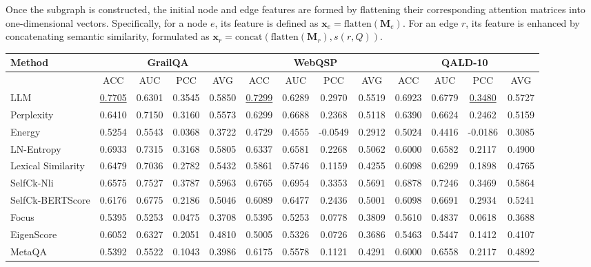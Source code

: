 \documentclass[11pt]{article}
\begin{document}
Once the subgraph is constructed, the initial node and edge features are formed by flattening their corresponding attention matrices into one-dimensional vectors. Specifically, for a node $e$, its feature is defined as \(\mathbf{x}_e = \text{flatten}(\mathbf{M}_e)\). For an edge $r$, its feature is enhanced by concatenating semantic similarity, formulated as \(\mathbf{x}_r = \text{concat}( \text{flatten}(\mathbf{M}_r), s(r, Q))\).

\begin{table}[t]
\centering
\fontsize{8.6pt}{10pt}\selectfont
\setlength{\tabcolsep}{2pt}   
\renewcommand{\arraystretch}{1.3}
\begin{tabular}{l | c c c c | c c c c | c c c c}
\hline
\textbf{Method} & \multicolumn{4}{c}{\textbf{GrailQA}} & \multicolumn{4}{c}{\textbf{WebQSP}} & \multicolumn{4}{c}{\textbf{QALD-10}} \\
\hline
 & ACC & AUC & PCC & AVG & ACC & AUC & PCC & AVG & ACC & AUC & PCC & AVG \\
\hline
LLM & \underline{0.7705} & 0.6301 & 0.3545 & 0.5850 & \underline{0.7299} & 0.6289 & 0.2970 & 0.5519 & 0.6923 & 0.6779 & \underline{0.3480} & 0.5727 \\
Perplexity & 0.6410 & 0.7150 & 0.3160 & 0.5573 & 0.6299 & 0.6688 & 0.2368 & 0.5118 & 0.6390 & 0.6624 & 0.2462 & 0.5159 \\
Energy & 0.5254 & 0.5543 & 0.0368 & 0.3722 & 0.4729 & 0.4555 & -0.0549 & 0.2912 & 0.5024 & 0.4416 & -0.0186 & 0.3085 \\
LN-Entropy & 0.6933 & 0.7315 & 0.3168 & 0.5805 & 0.6337 & 0.6581 & 0.2268 & 0.5062 & 0.6000 & 0.6582 & 0.2117 & 0.4900 \\
Lexical Similarity & 0.6479 & 0.7036 & 0.2782 & 0.5432 & 0.5861 & 0.5746 & 0.1159 & 0.4255 & 0.6098 & 0.6299 & 0.1898 & 0.4765 \\
SelfCk-Nli & 0.6575 & 0.7527 & 0.3787 & 0.5963 & 0.6765 & 0.6954 & 0.3353 & 0.5691 & 0.6878 & 0.7246 & 0.3469 & 0.5864 \\
SelfCk-BERTScore & 0.6176 & 0.6775 & 0.2186 & 0.5046 & 0.6089 & 0.6477 & 0.2436 & 0.5001 & 0.6098 & 0.6691 & 0.2934 & 0.5241 \\
Focus & 0.5395 & 0.5253 & 0.0475 & 0.3708 & 0.5395 & 0.5253 & 0.0778 & 0.3809 & 0.5610 & 0.4837 & 0.0618 & 0.3688 \\
EigenScore & 0.6052 & 0.6327 & 0.2051 & 0.4810 & 0.5005 & 0.5326 & 0.0726 & 0.3686 & 0.5463 & 0.5447 & 0.1412 & 0.4107 \\
MetaQA & 0.5392 & 0.5522 & 0.1043 & 0.3986 & 0.6175 & 0.5578 & 0.1121 & 0.4291 & 0.6000 & 0.6558 & 0.2117 & 0.4892 \\

\end{tabular}
\end{table}
\end{document}
